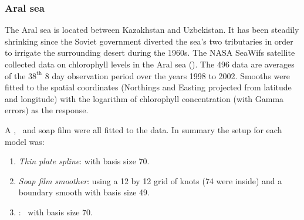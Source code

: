 {\subsubsection{Aral sea}
\label{aral-sec}

The Aral sea is located between Kazakhstan and Uzbekistan. It has been steadily shrinking since the Soviet government diverted the sea's two tributaries in order to irrigate the surrounding desert during the 1960s. The NASA SeaWifs satellite collected data on chlorophyll levels in the Aral sea (\cite{soap}). The 496 data are averages of the $38^\text{th}$ 8 day observation period over the years 1998 to 2002. Smooths were fitted to the spatial coordinates (Northings and Easting projected from latitude and longitude) with the logarithm of chlorophyll concentration (with Gamma errors) as the response.

A \tprs, \mdsap\ and soap film were all fitted to the data. In summary the setup for each model was:

\begin{enumerate}
\item \emph{Thin plate spline}:  with basis size 70.
\item \emph{Soap film smoother}: using a 12 by 12 grid of knots (74 were inside) and a boundary smooth with basis size 49.
\item \emph{\mdsap}: \tprs\ with basis size 70.
\end{enumerate}

}
